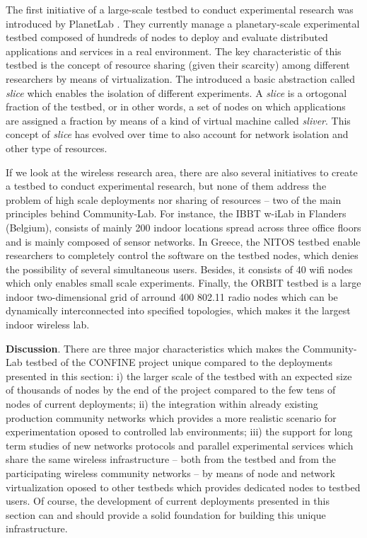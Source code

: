 \documentclass[conference]{IEEEtran}
\begin{document}
The first initiative of a large-scale testbed to conduct experimental research was introduced by PlanetLab \cite{planetlab}.
They currently manage a planetary-scale experimental testbed composed of hundreds of nodes to deploy and
evaluate distributed applications and services in a real environment. The key characteristic of this
testbed is the concept of resource sharing (given their scarcity) among different researchers by means of
virtualization. The introduced a basic abstraction called \textit{slice} which enables the isolation
of different experiments. A \textit{slice} is a ortogonal fraction 
of the testbed, or in other words, a set of nodes on which applications are assigned a fraction by means of a
kind of virtual machine called \textit{sliver}. This concept of \textit{slice} has evolved over time to also
account for network isolation and other type of resources.

If we look at the wireless research area, there are also several initiatives to create a testbed to conduct
experimental research, but none of them address the problem of high scale deployments nor sharing of resources -- two
of the main principles behind Community-Lab. For instance, the IBBT w-iLab \cite{ibbt} in Flanders (Belgium), 
consists of mainly 200 indoor locations spread across three office floors and is mainly composed of sensor networks. In
Greece, the NITOS \cite{nitos} testbed enable researchers to completely control the software on the testbed nodes, which denies 
the possibility of several simultaneous users. Besides, it consists of 40 wifi nodes which only enables 
small scale experiments. Finally, the ORBIT testbed \cite{orbit} is a large
indoor two-dimensional grid of arround 400 802.11 radio nodes which can be dynamically interconnected
into specified topologies, which makes it the largest indoor wireless lab.

\textbf{Discussion}. There are three major characteristics which makes the Community-Lab
testbed of the CONFINE project unique compared to the deployments presented in this section: i) the 
larger scale of the testbed with an expected size of thousands of nodes by the end of the project compared to the few tens
of nodes of current deployments; ii) the integration within already existing production community networks which provides
a more realistic scenario for experimentation oposed to controlled lab environments; iii) the support for long term studies
of new networks protocols and parallel experimental services which share the same wireless infrastructure -- both from the testbed and from the participating wireless community networks -- by means of
node and network virtualization oposed to other testbeds which provides dedicated nodes to testbed users.
Of course, the development of current deployments presented in this section can and should provide a solid foundation for building
this unique infrastructure.
\end{document}
